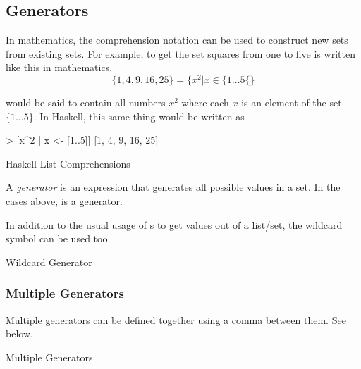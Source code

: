 \subsection{Generators}\label{subsec:Generators}
In mathematics, the comprehension notation can be used to construct new sets from existing sets.
For example, to get the set squares from one to five is written like this in mathematics.
\begin{equation}\label{eq:Generator}
  \lbrace 1, 4, 9, 16, 25 \rbrace = \bigl\lbrace x^{2} \vert x \in \lbrace 1 \ldots 5 \lbrace \bigr\rbrace
\end{equation}

 would be said to contain all numbers $x^{2}$ where each $x$ is an element of the set $\lbrace 1 \ldots 5 \rbrace$.
In Haskell, this same thing would be written as
\begin{listing}[h!tbp]
\begin{haskellsource}
> [x^2 | x <- [1..5]]
[1, 4, 9, 16, 25]
\end{haskellsource}
\caption{Haskell List Comprehensions}
\label{lst:List_Comprehension}
\end{listing}

\begin{definition}[Generator]\label{def:Generator}
  A \emph{generator} is an expression that generates all possible values in a set.
  In the cases above,  is a generator.
\end{definition}

In addition to the usual usage of s to get values out of a list/set, the wildcard symbol \haskellinline{_} can be used too.
\begin{listing}[h!tbp]
\caption{Wildcard Generator}
\label{lst:Wildcard_Generator}
\end{listing}

\subsubsection{Multiple Generators}\label{subsubsec:Multiple_Generators}
Multiple generators can be defined together using a comma between them.
See  below.
\begin{listing}[h!tbp]
\caption{Multiple Generators}
\label{lst:Multiple_Generators}
\end{listing}

